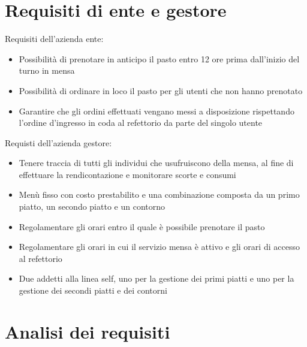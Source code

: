 \documentclass[a4paper, titlepage, 12pt, openright, twoside]{book}
\begin{document}
\section{Requisiti di ente e gestore}

Requisiti dell'azienda ente:
\begin{itemize}
	\item Possibilità di prenotare in anticipo il pasto entro 12 ore prima dall'inizio del turno in mensa
	\item Possibilità di ordinare in loco il pasto per gli utenti che non hanno prenotato
	\item Garantire che gli ordini effettuati vengano messi a disposizione rispettando l'ordine d'ingresso in coda al refettorio da parte del singolo utente
\end{itemize}

Requisti dell'azienda gestore:
\begin{itemize}
	\item Tenere traccia di tutti gli individui che usufruiscono della mensa, al fine di effettuare la rendicontazione e monitorare scorte e consumi
	\item Menù fisso con costo prestabilito e una combinazione composta da un primo piatto, un secondo piatto e un contorno
	\item Regolamentare gli orari entro il quale è possibile prenotare il pasto
	\item Regolamentare gli orari in cui il servizio mensa è attivo e gli orari di accesso al refettorio
	\item Due addetti alla linea self, uno per la gestione dei primi piatti e uno per la gestione dei secondi piatti e dei contorni
\end{itemize}

\section{Analisi dei requisiti}
\end{document}
